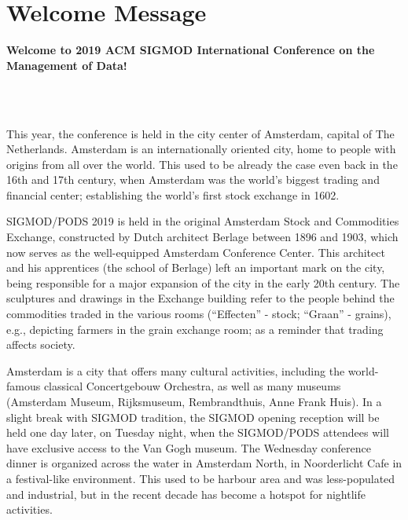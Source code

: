 \section*{Welcome Message}


\textbf{Welcome to 2019 ACM SIGMOD International Conference 
on the Management of Data!}

~\\~

This year, the conference is held in the city center of Amsterdam, capital of The Netherlands. Amsterdam is an internationally oriented city, home to people with origins from all over the world. This used to be already the case even back in the 16th and 17th century, when Amsterdam was the world's biggest trading and financial center; establishing the world's first stock exchange in 1602.

SIGMOD/PODS 2019 is held in the original Amsterdam Stock and Commodities Exchange, constructed by Dutch architect Berlage between 1896 and 1903, which now serves as the well-equipped Amsterdam Conference Center. This architect and his apprentices (the school of Berlage) left an important mark on the city, being responsible for a major expansion of the city in the early 20th century. The sculptures and drawings in the Exchange building refer to the people behind the commodities traded in the various rooms (``Effecten'' - stock; ``Graan'' - grains), e.g., depicting farmers in the grain exchange room; as a reminder that trading affects society.

Amsterdam is a city that offers many cultural activities, including the world-famous classical Concertgebouw Orchestra, as well as many museums (Amsterdam Museum, Rijksmuseum, Rembrandthuis, Anne Frank Huis). In a slight break with SIGMOD tradition, the SIGMOD opening reception will be held one day later, on Tuesday night, when the SIGMOD/PODS attendees will have exclusive access to the Van Gogh museum. The Wednesday conference dinner is organized across the water in Amsterdam North, in Noorderlicht Cafe in a festival-like environment. This used to be harbour area and was less-populated and industrial, but in the recent decade has become a hotspot for nightlife activities.

